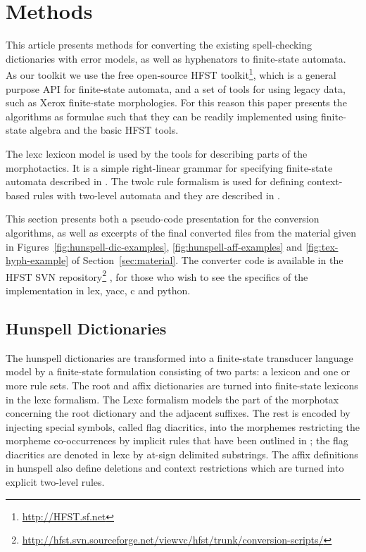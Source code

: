 \documentclass[a4paper,conference]{IEEEtran}
\begin{document}
\section{Methods}
\label{sec:methods}

This article presents methods for converting the existing spell-checking
dictionaries with error models, as well as hyphenators to finite-state
automata. As our toolkit we use the free open-source HFST
toolkit\footnote{\url{http://HFST.sf.net}}, which is a general purpose API for
finite-state automata, and a set of tools for using legacy data, such as Xerox
finite-state morphologies. For this reason this paper presents the algorithms
as formulae such that they can be readily implemented using finite-state
algebra and the basic HFST tools.

The lexc lexicon model is used by the tools for describing parts of the
morphotactics. It is a simple right-linear grammar for specifying finite-state
automata described in \cite{beesley/2003,conf/sfcm/Linden2009}. The twolc rule
formalism is used for defining context-based rules with two-level automata and
they are described in \cite{koskenniemi/1983,conf/sfcm/Linden2009}.

This section presents both a pseudo-code presentation for the conversion
algorithms, as well as excerpts of the final converted files from the material
given in Figures~\ref{fig:hunspell-dic-examples},
\ref{fig:hunspell-aff-examples} and \ref{fig:tex-hyph-example} of
Section~\ref{sec:material}.  The converter code is available in the HFST SVN
repository\footnote{\url{http://hfst.svn.sourceforge.net/viewvc/hfst/trunk/conversion-scripts/}}
, for those who wish to see the specifics of the implementation in
lex, yacc, c and python.

\subsection{Hunspell Dictionaries}

The hunspell dictionaries are transformed into a finite-state transducer
language model by a finite-state formulation consisting of two parts: a lexicon
and one or more rule sets. The root and affix dictionaries are turned into
finite-state lexicons in the lexc formalism. The Lexc formalism models the part
of the morphotax concerning the root dictionary and the adjacent suffixes. The
rest is encoded by injecting special symbols, called flag diacritics, into the
morphemes restricting the morpheme co-occurrences by implicit rules that have
been outlined in \cite{beesley/1998}; the flag diacritics are denoted in lexc
by at-sign delimited substrings. The affix definitions in hunspell also define
deletions and context restrictions which are turned into explicit two-level
rules.
\end{document}
